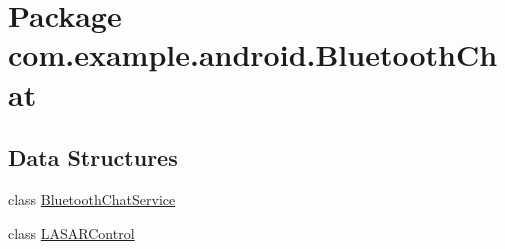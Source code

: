 \hypertarget{namespacecom_1_1example_1_1android_1_1_bluetooth_chat}{\section{Package com.\-example.\-android.\-Bluetooth\-Chat}
\label{namespacecom_1_1example_1_1android_1_1_bluetooth_chat}
}
\subsection*{Data Structures}
\begin{DoxyCompactItemize}
\item 
class \hyperlink{classcom_1_1example_1_1android_1_1_bluetooth_chat_1_1_bluetooth_chat_service}{Bluetooth\-Chat\-Service}
\item 
class \hyperlink{classcom_1_1example_1_1android_1_1_bluetooth_chat_1_1_l_a_s_a_r_control}{L\-A\-S\-A\-R\-Control}
\end{DoxyCompactItemize}
